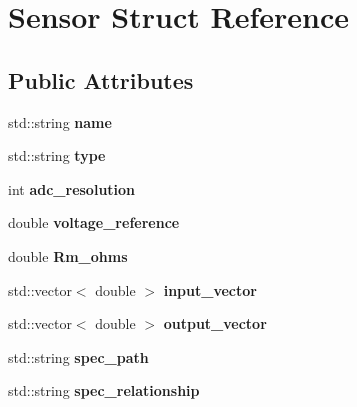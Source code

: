 \hypertarget{structSensor}{}\section{Sensor Struct Reference}
\label{structSensor}
\subsection*{Public Attributes}
\begin{DoxyCompactItemize}
\item 
\mbox{\label{structSensor_a3cef064eb9ac7dc5f2cff9de3c7afb6e}} 
std\+::string {\bfseries name}
\item 
\mbox{\label{structSensor_a6fe1dbe1e72b79e52eb42afe07c976b7}} 
std\+::string {\bfseries type}
\item 
\mbox{\label{structSensor_a1c31e0ceb92cdb9d55d1f0ed1ce8ae46}} 
int {\bfseries adc\+\_\+resolution}
\item 
\mbox{\label{structSensor_a98f7a70d5885ab4b56c878d7cce481af}} 
double {\bfseries voltage\+\_\+reference}
\item 
\mbox{\label{structSensor_ad5647e7657ce4327ac760d7e958b2443}} 
double {\bfseries Rm\+\_\+ohms}
\item 
\mbox{\label{structSensor_afd0d448fa0fc1efd3d76317c51c5b0a4}} 
std\+::vector$<$ double $>$ {\bfseries input\+\_\+vector}
\item 
\mbox{\label{structSensor_a2e51465ca979a2bf88eddbb795d79a1d}} 
std\+::vector$<$ double $>$ {\bfseries output\+\_\+vector}
\item 
\mbox{\label{structSensor_a58b97eefd41342bc436531b1e67df6a9}} 
std\+::string {\bfseries spec\+\_\+path}
\item 
\mbox{\label{structSensor_a32ffc5a800dd0661b01b39bb35672c9b}} 
std\+::string {\bfseries spec\+\_\+relationship}
\item 
\mbox{\label{structSensor_a917e165a96c4b667457634c319ada995}} 

\end{DoxyCompactItemize}
